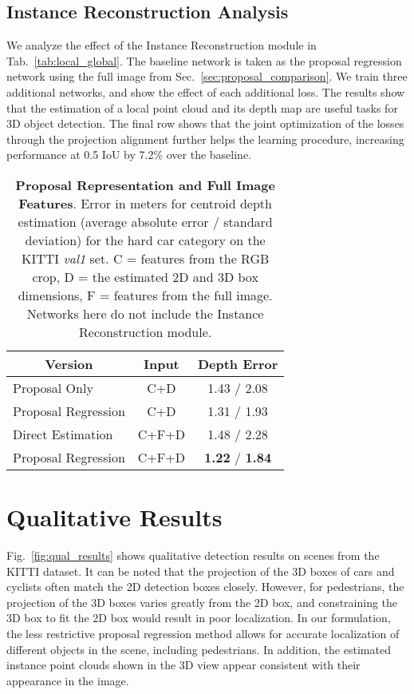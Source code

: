 \documentclass[10pt,twocolumn,letterpaper]{article}
\begin{document}
	\subsection{Instance Reconstruction Analysis} \label{sec:instance_reconstruction_analysis}
	We analyze the effect of the Instance Reconstruction module in Tab.~\ref{tab:local_global}. The baseline network is taken as the proposal regression network using the full image from Sec.~\ref{sec:proposal_comparison}. We train three additional networks, and show the effect of each additional loss. The results show that the estimation of a local point cloud and its depth map are useful tasks for 3D object detection. The final row shows that the joint optimization of the losses through the projection alignment further helps the learning procedure, increasing  performance at 0.5 IoU by 7.2\% over the baseline.
	
	
	\begin{table}[t]
		\small
		\centering
		\begin{tabular}{|l|c|c|}
			\hline
			\multicolumn{1}{|c|}{Version} & Input & Depth Error \\ \hline
			Proposal Only       & C+D   & 1.43 / 2.08  \\
			Proposal Regression & C+D   & 1.31 / 1.93 \\
			Direct Estimation   & C+F+D & 1.48 / 2.28 \\
			Proposal Regression & C+F+D & \textbf{1.22} / \textbf{1.84} \\
			\hline
		\end{tabular}
		\caption{\textbf{Proposal Representation and Full Image Features}. Error in meters for centroid depth estimation (average absolute error / standard deviation) for the hard car category on the KITTI \emph{val1} set. C = features from the RGB crop, D = the estimated 2D and 3D box dimensions, F = features from the full image. Networks here do not include the Instance Reconstruction module.}
		\label{tab:proposal_comparison}
	\end{table}
	
	\section{Qualitative Results}
	Fig.~\ref{fig:qual_results} shows qualitative detection results on scenes from the KITTI dataset. It can be noted that the projection of the 3D boxes of cars and cyclists often match the 2D detection boxes closely. However, for pedestrians, the projection of the 3D boxes varies greatly from the 2D box, and constraining the 3D box to fit the 2D box would result in poor localization. In our formulation, the less restrictive proposal regression method allows for accurate localization of different objects in the scene, including pedestrians. In addition, the estimated instance point clouds shown in the 3D view appear consistent with their appearance in the image.
	
\end{document}
